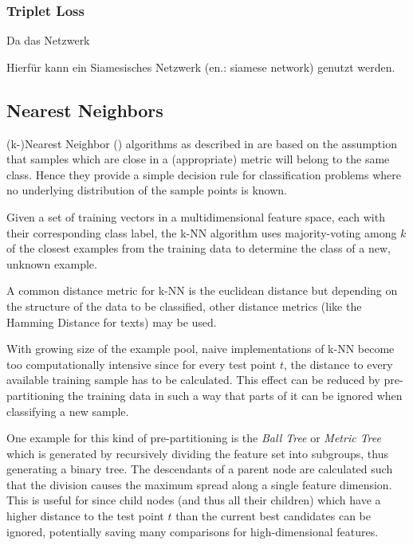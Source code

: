 	 
	 
%	 	
	 
	 	 \subsubsection{Triplet Loss}
	 Da das Netzwerk 
	 
	 
	 
	 Hierfür kann ein Siamesisches Netzwerk (en.: siamese network) genutzt werden. 

		\subsection{Nearest Neighbors}
	(k-)Nearest Neighbor () algorithms as described in \cite{Cover1967, Fix1952} are based on the assumption that samples which are close in a (appropriate) metric will belong to the same class. Hence they provide a simple decision rule for classification problems where no underlying distribution of the sample points is known. 
	
	Given a set of training vectors in a multidimensional feature space, each with their corresponding class label, the k-NN algorithm uses majority-voting among $k$ of the closest examples from the training data to determine the class of a new, unknown example.
	
	A common distance metric for k-NN is the euclidean distance but depending on the structure of the data to be classified, other distance metrics (like the Hamming Distance for texts) may be used.
	
	With growing size of the example pool, naive implementations of k-NN become too computationally intensive since for every test point $t$, the distance to every available training sample has to be calculated. This effect can be reduced by pre-partitioning the training data in such a way that parts of it can be ignored when classifying a new sample. 
	
	One example for this kind of pre-partitioning is the \textit{Ball Tree} or \textit{Metric Tree} which is generated by recursively dividing the feature set into subgroups, thus generating a binary tree. The descendants of a parent node are calculated such that the division causes the maximum spread along a single feature dimension. This is useful for  since child nodes (and thus all their children) which have a higher distance to the test point $t$ than the current best candidates can be ignored, potentially saving many comparisons for high-dimensional features.
	
